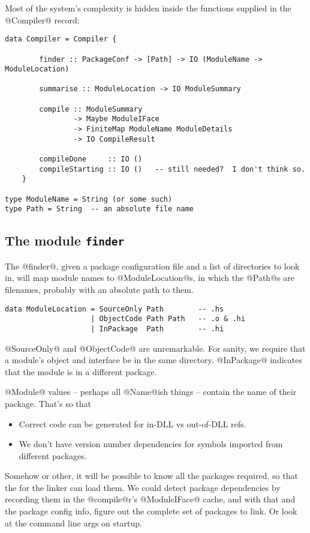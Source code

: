 \documentclass[11pt]{article}
\begin{document}
Most of the system's complexity is hidden inside the functions
supplied in the @Compiler@ record:
\begin{verbatim}        
data Compiler = Compiler {        

        finder :: PackageConf -> [Path] -> IO (ModuleName -> ModuleLocation)

        summarise :: ModuleLocation -> IO ModuleSummary

        compile :: ModuleSummary
                -> Maybe ModuleIFace 
                -> FiniteMap ModuleName ModuleDetails
                -> IO CompileResult

        compileDone     :: IO ()
        compileStarting :: IO ()   -- still needed?  I don't think so.
    }

type ModuleName = String (or some such)
type Path = String  -- an absolute file name
\end{verbatim}

\subsection{The module \mbox{\tt finder}}
The @finder@, given a package configuration file and a list of
directories to look in, will map module names to @ModuleLocation@s,
in which the @Path@s are filenames, probably with an absolute path
to them.
\begin{verbatim}
data ModuleLocation = SourceOnly Path        -- .hs
                    | ObjectCode Path Path   -- .o & .hi
                    | InPackage  Path        -- .hi
\end{verbatim}
@SourceOnly@ and @ObjectCode@ are unremarkable.  For sanity,
we require that a module's object and interface be in the same
directory.  @InPackage@ indicates that the module is in a 
different package.

@Module@ values -- perhaps all @Name@ish things -- contain the name of
their package.  That's so that 
\begin{itemize}
\item Correct code can be generated for in-DLL vs out-of-DLL refs.
\item We don't have version number dependencies for symbols
      imported from different packages.
\end{itemize}

Somehow or other, it will be possible to know all the packages
required, so that the for the linker can load them.
We could detect package dependencies by recording them in the
@compile@r's @ModuleIFace@ cache, and with that and the 
package config info, figure out the complete set of packages
to link.  Or look at the command line args on startup.
\end{document}
